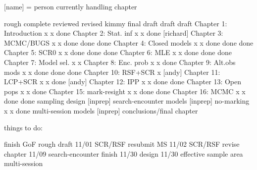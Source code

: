 [name] = person currently handling chapter


                          rough   complete reviewed  revised kimmy final 
                          draft    draft                           draft
Chapter 1: Introduction       x       x     done    
Chapter 2: Stat. inf          x       x     done    [richard]
Chapter 3: MCMC/BUGS          x       x     done     done    done
Chapter 4: Closed models      x       x     done     done    done
Chapter 5: SCR0               x       x     done     done    done
Chapter 6: MLE                x       x     done     done    done
Chapter 7: Model sel.         x       x    
Chapter 8: Enc. prob          x       x     done
Chapter 9: Alt.obs mods       x       x     done     done    done
Chapter 10: RSF+SCR           x    [andy]
Chapter 11: LCP+SCR           x       x     done    [andy]
Chapter 12: IPP               x       x     done     done       
Chapter 13: Open pops         x       x     done 
Chapter 15: mark-resight      x       x     done     done 
Chapter 16: MCMC              x       x     done     done
sampling design            [inprep]
search-encounter models    [inprep]
no-marking                    x       x     done
multi-session models       [inprep]
conclusions/final chapter





things to do:

finish GoF rough draft   11/01
SCR/RSF resubmit MS      11/02
SCR/RSF revise chapter   11/09
search-encounter finish  11/30
design                   11/30
effective sample area  
multi-session
